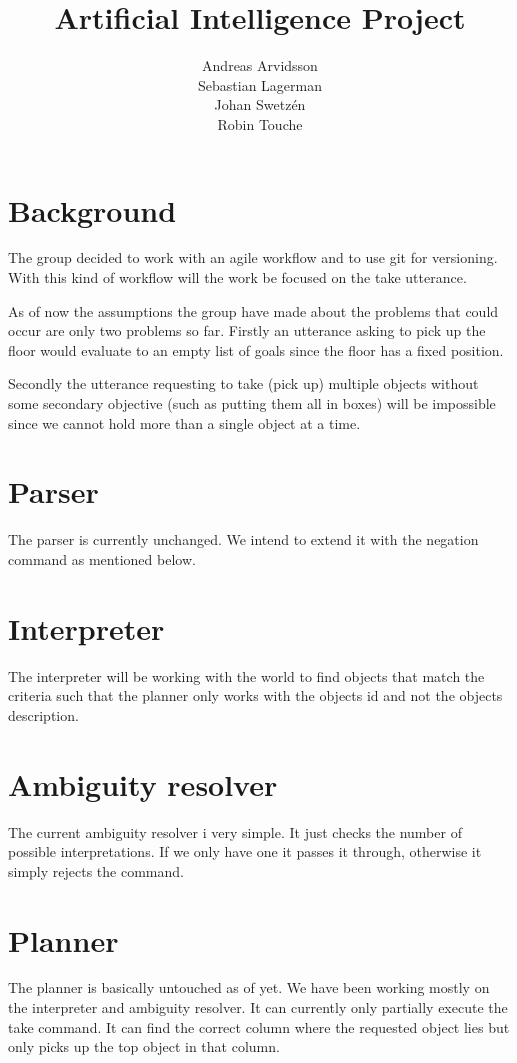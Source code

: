 \documentclass[a4paper]{article}
\title{Artificial Intelligence Project}
\date{}
\author{Andreas Arvidsson \\ Sebastian Lagerman \\ Johan Swetz\'{e}n \\ Robin Touche \\}
\begin{document}
\maketitle

\section*{Background}
The group decided to work with an agile workflow and to use git for versioning.
With this kind of workflow will the work be focused on the take utterance.

As of now the assumptions the group have made about the problems that could
occur are only two problems so far. Firstly an utterance asking to pick up the
floor would evaluate to an empty list of goals since the floor has a fixed
position.

Secondly the utterance requesting to take (pick up) multiple objects
without some secondary objective (such as putting them all in boxes) will be
impossible since we cannot hold more than a single object at a time.

\section*{Parser}
The parser is currently unchanged. We intend to extend it with the negation
command as mentioned below.

\section*{Interpreter}
The interpreter will be working with the world to find objects that match the
criteria such that the planner only works with the objects id and not the
objects description.

\section*{Ambiguity resolver}
The current ambiguity resolver i very simple. It just checks the number of
possible interpretations. If we only have one it passes it through, otherwise
it simply rejects the command.

\section*{Planner}
The planner is basically untouched as of yet. We have been working mostly on
the interpreter and ambiguity resolver. It can currently only partially execute
the take command. It can find the correct column where the requested object
lies but only picks up the top object in that column.
\end{document}
